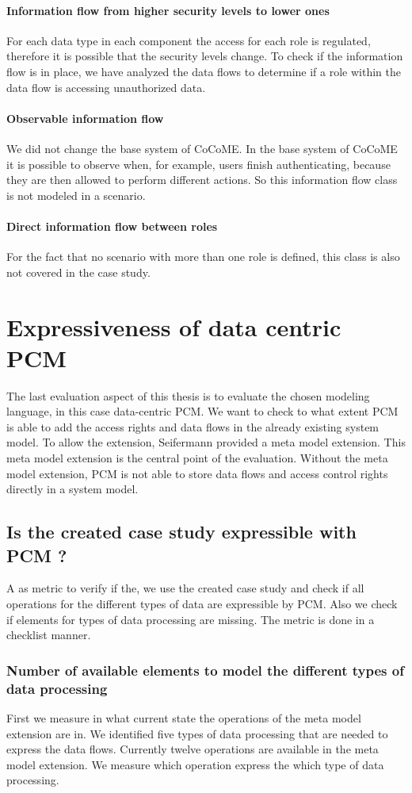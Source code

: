 \paragraph{Information flow from higher security levels to lower ones}
For each data type in each component the access for each role is regulated, therefore it is possible that the security levels change. To check if the information flow is in place, we have analyzed the data flows to determine if a role within the data flow is accessing  unauthorized data.  
\paragraph{Observable information flow}
We did not change the base system of CoCoME. In the base system of CoCoME it is possible to observe when, for example, users finish authenticating, because they are then allowed to perform different actions. So this information flow class is not modeled in a scenario. 
\paragraph{Direct information flow between roles} For the fact that no scenario with more than one role is defined, this class is also not covered in the case study.
\section{Expressiveness of data centric PCM}
The last evaluation aspect of this thesis is to evaluate the chosen modeling language, in this case data-centric PCM. We want to check to what extent PCM is able to add the access rights and data flows in the already existing system model. To allow the extension, Seifermann \cite{MMextension} provided a meta model extension. This meta model extension is the central point of the evaluation. Without the meta model extension, PCM is not able to store data flows and access control rights directly in a system model. 
\subsection{Is the created case study expressible with PCM ?}
A as metric to verify if the, we use the created case study and check if all operations for the different types of data are expressible by PCM. Also we check if elements for types of data processing are missing. The metric is done in a checklist manner. 
\subsubsection{Number of available elements to model the different types of data processing}
First we measure in what current state the operations of the meta model extension are in. We identified five types of data processing that are needed to express the data flows. Currently twelve operations are available in the meta model extension. We measure which operation express the which type of data processing.
